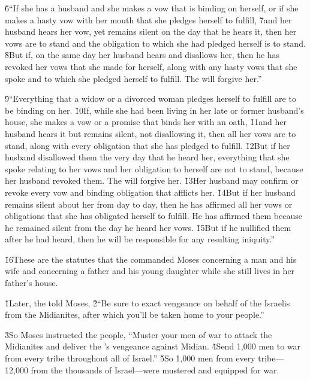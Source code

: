 \v{6}``If she has a husband and she makes a vow that is binding on herself, or if she makes a hasty vow with her mouth that she pledges herself to fulfill, \v{7}and her husband hears her vow, yet remains silent on the day that he hears it, then her vows are to stand and the obligation to which she had pledged herself is to stand. \v{8}But if, on the same day her husband hears and disallows her, then he has revoked her vows that she made for herself, along with any hasty vows that she spoke and to which she pledged herself to fulfill. The  will forgive her.''

\v{9}``Everything that a widow or a divorced woman pledges herself to fulfill are to be binding on her. \v{10}If, while she had been living in her late or former husband's house, she makes a vow or a promise that binds her with an oath, \v{11}and her husband hears it but remains silent, not disallowing it, then all her vows are to stand, along with every obligation that she has pledged to fulfill. \v{12}But if her husband disallowed them the very day that he heard her, everything that she spoke relating to her vows and her obligation to herself are not to stand, because her husband revoked them. The  will forgive her. \v{13}Her husband may confirm or revoke every vow and binding obligation that afflicts her. \v{14}But if her husband remains silent about her from day to day, then he has affirmed all her vows or obligations that she has obligated herself to fulfill. He has affirmed them because he remained silent from the day he heard her vows. \v{15}But if he nullified them after he had heard, then he will be responsible for any resulting iniquity.''

\v{16}These are the statutes that the  commanded Moses concerning a man and his wife and concerning a father and his young daughter while she still lives in her father's house.

\v{1}Later, the  told Moses, \v{2}``Be sure to exact vengeance on behalf of the Israelis from the Midianites, after which you'll be taken home to your people.''

\v{3}So Moses instructed the people, ``Muster your men of war to attack the Midianites and deliver the 's vengeance against Midian. \v{4}Send 1,000 men to war from every tribe throughout all of Israel.'' \v{5}So 1,000 men from every tribe---12,000 from the thousands of Israel---were mustered and equipped for war.

